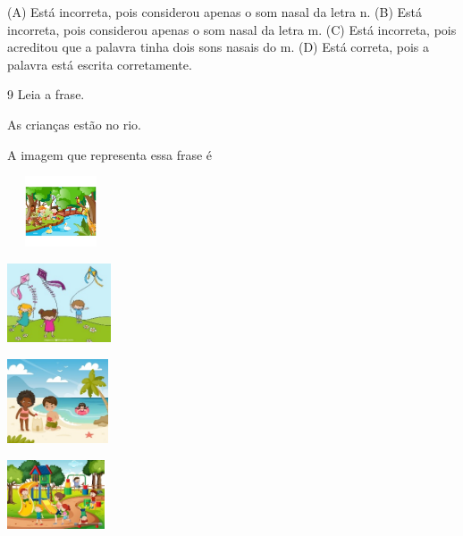 (A) Está incorreta, pois considerou apenas o som nasal da letra n.
(B) Está incorreta, pois considerou apenas o som nasal da letra m.
(C) Está incorreta, pois acreditou que a palavra tinha dois sons nasais do m.
(D) Está correta, pois a palavra está escrita corretamente.

\num{9} Leia a frase.

As crianças estão no rio.

A imagem que representa essa frase é

\begin{escolha}
\item \includegraphics[width=1.25000in,height=0.82361in]{media/image154.jpeg}

\item \includegraphics[width=1.21181in,height=0.92014in]{media/image155.jpeg}

\item \includegraphics[width=1.18125in,height=0.98472in]{media/image156.jpeg}

\item \includegraphics[width=1.13611in,height=0.80208in]{media/image157.jpeg}
\end{escolha}


